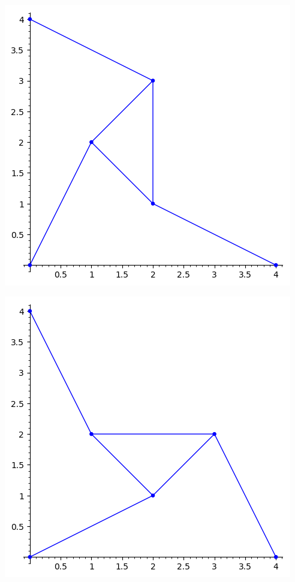 \documentclass{article}
\begin{document}
\begin{multicols}{2}
\begin{center}
\includegraphics[scale=0.4]{lidur3aplot}
\end{center}
\columnbreak
\begin{center}
\includegraphics[scale=0.4]{lidur3bplot}
\end{center}
\end{multicols}
\end{document}
